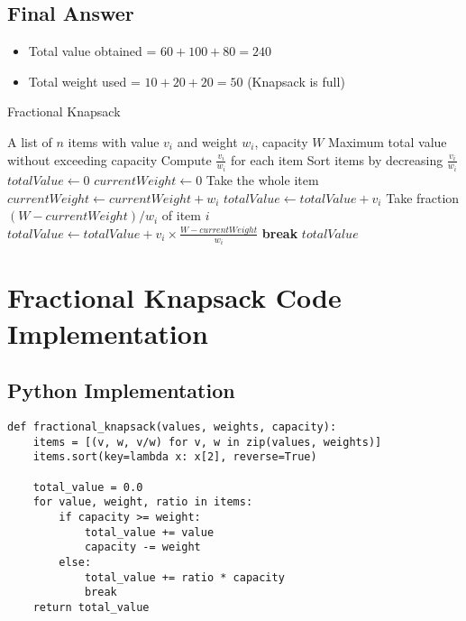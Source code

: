 \documentclass[14pt]{extarticle}
\begin{document}
\subsection{Final Answer}

\begin{itemize}
    \item Total value obtained = $60 + 100 + 80 = 240$
    \item Total weight used = $10 + 20 + 20 = 50$ (Knapsack is full)
\end{itemize}

\begin{algorithm}
\caption{Fractional Knapsack}
\begin{algorithmic}[1]
\Require A list of $n$ items with value $v_i$ and weight $w_i$, capacity $W$
\Ensure Maximum total value without exceeding capacity
\State Compute $\frac{v_i}{w_i}$ for each item
\State Sort items by decreasing $\frac{v_i}{w_i}$
\State $totalValue \gets 0$
\State $currentWeight \gets 0$
        \State Take the whole item
        \State $currentWeight \gets currentWeight + w_i$
        \State $totalValue \gets totalValue + v_i$
    \Else
        \State Take fraction $(W - currentWeight)/w_i$ of item $i$
        \State $totalValue \gets totalValue + v_i \times \frac{W - currentWeight}{w_i}$
        \State \textbf{break}
    \EndIf
\EndFor
\State \Return $totalValue$
\end{algorithmic}
\end{algorithm}

\newpage
\section{Fractional Knapsack Code Implementation}
\subsection{Python Implementation}
\begin{lstlisting}[style=python, caption={Fractional Knapsack in Python}]
def fractional_knapsack(values, weights, capacity):
    items = [(v, w, v/w) for v, w in zip(values, weights)]
    items.sort(key=lambda x: x[2], reverse=True)

    total_value = 0.0
    for value, weight, ratio in items:
        if capacity >= weight:
            total_value += value
            capacity -= weight
        else:
            total_value += ratio * capacity
            break
    return total_value
\end{lstlisting}
\end{document}

